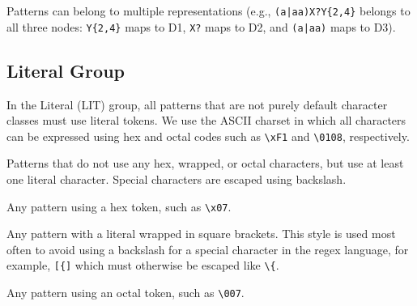 Patterns can belong to multiple representations (e.g., \verb!(a|aa)X?Y{2,4}! belongs to all three nodes: \verb!Y{2,4}! maps to D1, \verb!X?!  maps  to D2, and \verb!(a|aa)!  maps  to D3).




\subsection{Literal Group}
In the Literal (LIT) group, all patterns that are not purely default character classes must use  literal tokens. 
We use the ASCII charset in which all characters can be expressed using hex and octal codes such as \verb!\xF1! and \verb!\0108!, respectively.  



\begin{description}  \itemsep -1pt
\item[T1:] Patterns that do not use any hex, wrapped, or octal characters, but use at least one literal character. Special characters are escaped using backslash. 
\item[T2:] Any pattern using a hex token, such as \verb!\x07!.
\item[T3:]  Any pattern with a literal wrapped in square brackets. 
This style is used most often to avoid using a backslash for a special character in the regex language, for example, \verb![{]! which must otherwise be escaped like \verb!\{!.

\item[T4:] Any pattern using an octal token, such as \verb!\007!.
\end{description}

